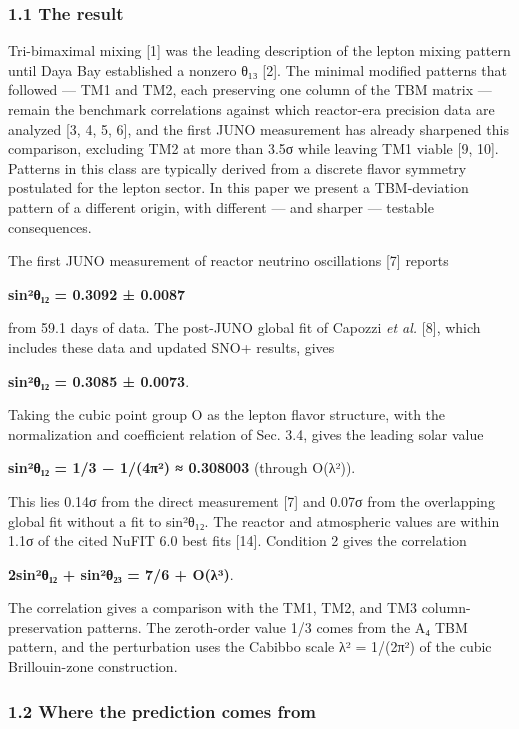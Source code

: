 \documentclass[
]{article}
\begin{document}
\hypertarget{the-result}{%
\subsubsection{1.1 The result}\label{the-result}}

Tri-bimaximal mixing {[}1{]} was the leading description of the lepton
mixing pattern until Daya Bay established a nonzero θ₁₃ {[}2{]}. The
minimal modified patterns that followed --- TM1 and TM2, each preserving
one column of the TBM matrix --- remain the benchmark correlations
against which reactor-era precision data are analyzed {[}3, 4, 5, 6{]},
and the first JUNO measurement has already sharpened this comparison,
excluding TM2 at more than 3.5σ while leaving TM1 viable {[}9, 10{]}.
Patterns in this class are typically derived from a discrete flavor
symmetry postulated for the lepton sector. In this paper we present a
TBM-deviation pattern of a different origin, with different --- and
sharper --- testable consequences.

The first JUNO measurement of reactor neutrino oscillations {[}7{]}
reports

\textbf{sin²θ₁₂ = 0.3092 ± 0.0087}

from 59.1 days of data. The post-JUNO global fit of Capozzi \emph{et
al.} {[}8{]}, which includes these data and updated SNO+ results, gives

\textbf{sin²θ₁₂ = 0.3085 ± 0.0073}.

Taking the cubic point group O as the lepton flavor structure, with the
normalization and coefficient relation of Sec. 3.4, gives the leading
solar value

\textbf{sin²θ₁₂ = 1/3 − 1/(4π²) ≈ 0.308003} (through O(λ²)).

This lies 0.14σ from the direct measurement {[}7{]} and 0.07σ from the
overlapping global fit without a fit to sin²θ₁₂. The reactor and
atmospheric values are within 1.1σ of the cited NuFIT 6.0 best fits
{[}14{]}. Condition 2 gives the correlation

\textbf{2sin²θ₁₂ + sin²θ₂₃ = 7/6 + O(λ³)}.

The correlation gives a comparison with the TM1, TM2, and TM3
column-preservation patterns. The zeroth-order value 1/3 comes from the
A₄ TBM pattern, and the perturbation uses the Cabibbo scale λ² = 1/(2π²)
of the cubic Brillouin-zone construction.

\hypertarget{where-the-prediction-comes-from}{%
\subsubsection{1.2 Where the prediction comes
from}\label{where-the-prediction-comes-from}}
\end{document}
